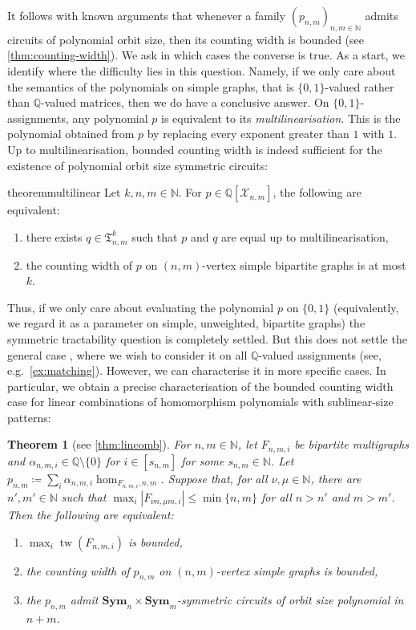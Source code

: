 \documentclass[11pt, DIV=15]{scrarticle}
\theoremstyle{definition}
\theoremstyle{plain}
\newtheorem{theorem}[definition]{Theorem}
\theoremstyle{remark}
\DeclareMathOperator{\tw}{tw}
\newcommand{\Sym}{\mathbf{Sym}}
\newcommand{\bbQ}{\mathbb{Q}}
\begin{document}
It follows with known arguments that whenever a family $(p_{n,m})_{n,m\in \mathbb{N}}$ admits circuits of polynomial orbit size, then its counting width is bounded (see \cref{thm:counting-width}). We ask in which cases the converse is true. As a start, we identify where the difficulty lies in this question. Namely, if we only care about the semantics of the polynomials on simple graphs, that is $\{0,1\}$-valued rather than $\bbQ$-valued matrices, then we do have a conclusive answer. On $\{0,1\}$-assignments, any polynomial $p$ is equivalent to its \emph{multilinearisation}. This is the polynomial obtained from $p$ by replacing every exponent greater than $1$ with $1$. Up to multilinearisation, bounded counting width is indeed sufficient for the existence of polynomial orbit size symmetric circuits:
	
	\begin{restatable}{theorem}{multilinear}
		\label{thm:multilinear}
		Let $k,n,m \in \mathbb{N}$.
		For $p \in \mathbb{Q}[\mathcal{X}_{n,m}]$, the following are equivalent:
		\begin{enumerate}
			\item there exists $q \in \mathfrak{T}^k_{n,m}$ such that $p$ and $q$ are equal up to multilinearisation,
			\item the counting width of $p$ on $(n,m)$-vertex simple bipartite graphs is at most $k$.
		\end{enumerate}
	\end{restatable}
	
Thus, if we only care about evaluating the polynomial $p$ on
$\{0,1\}$ (equivalently, we regard it as a parameter on simple,
unweighted, bipartite graphs) the symmetric tractability question is
completely settled.  But this does not settle the general case , where we wish to
consider it on all $\bbQ$-valued assignments (see,
e.g.~\cref{ex:matching}).  However, we can characterise it in more
specific cases.  In particular, 
we obtain a precise characterisation of the bounded counting width case for linear combinations of homomorphism polynomials with sublinear-size patterns:

\begin{theorem}[see \cref{thm:lincomb}]\label{thm:lincomb-intro} 
	For $n,m \in \mathbb{N}$, 
	let $F_{n,m,i}$ be bipartite multigraphs and $\alpha_{n,m,i}
        \in \mathbb{Q} \setminus \{0\}$ for $i \in [s_{n,m}]$ for some
        $s_{n,m} \in \mathbb{N}$. 
	Let $p_{n,m} \coloneqq \sum_i \alpha_{n,m,i} \hom_{F_{n,m,i}, n,m}$.
	Suppose that, for all $\nu, \mu \in \mathbb{N}$,
	there are $n', m' \in \mathbb{N}$ 
	such that $\max_i |F_{\nu n, \mu m,i}| \leq \min \{n,m\}$ for all $n > n'$ and $m > m'$.		
	Then the following are equivalent:
	\begin{enumerate}
		\item $\max_i \tw(F_{n,m,i})$ is bounded,
		\item the counting width of $p_{n,m}$ on $(n,m)$-vertex simple graphs is bounded,
		\item the $p_{n,m}$ admit $\Sym_n\times \Sym_m$-symmetric circuits of orbit size polynomial in $n+m$.
	\end{enumerate}
\end{theorem}
\end{document}
